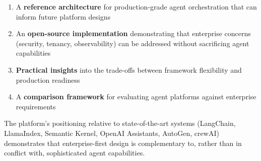 \begin{enumerate}
    \item A \textbf{reference architecture} for production-grade agent orchestration that can inform future platform designs
    \item An \textbf{open-source implementation} demonstrating that enterprise concerns (security, tenancy, observability) can be addressed without sacrificing agent capabilities
    \item \textbf{Practical insights} into the trade-offs between framework flexibility and production readiness
    \item A \textbf{comparison framework} for evaluating agent platforms against enterprise requirements
\end{enumerate}

The platform's positioning relative to state-of-the-art systems (LangChain, LlamaIndex, Semantic Kernel, OpenAI Assistants, AutoGen, crewAI) demonstrates that enterprise-first design is complementary to, rather than in conflict with, sophisticated agent capabilities.

